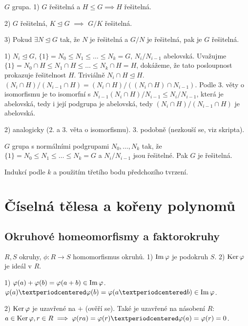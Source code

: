 \documentclass[12pt]{article}                   %
\begin{document}
        \begin{tvrzeni}
            $G$ grupa. 1) $G$ řešitelná a $H ≤ G \implies H$ řešitelná.

            2) $G$ řešitelná, $K \trianglelefteq G$ $\implies$ $G/K$ řešitelná.

            3) Pokud $\exists N \trianglelefteq G$ tak, že $N$ je řešitelná a $G / N$ je řešitelná, pak je $G$ řešitelná.

            \begin{dukazin}
                1) $N_i \trianglelefteq G$, $\{1\} = N_0 ≤ N_1 ≤ … ≤ N_k = G$, $N_i / N_{i-1}$ abelovská. Uvažujme $\{1\} = N_0 \cap H ≤ N_1 \cap H ≤ … ≤ N_k \cap H = H$, dokážeme, že tato posloupnost prokazuje řešitelnost $H$. Triviálně $N_i \cap H \trianglelefteq H$. $(N_i\cap H)/(N_{i-1} \cap H) = (N_i \cap H)/((N_i \cap H) \cap N_{i-1})$. Podle 3. věty o isomorfismu je to isomorfní s $N_{i-1}(N_i \cap H) / N_{i-1} ≤ N_i / N_{i-1}$, která je abelovská, tedy i její podgrupa je abelovská, tedy $(N_i \cap H)/(N_{i-1} \cap H)$ je abelovská.

                2) analogicky (2. a 3. věta o isomorfismu). 3. podobně (nezkouší se, viz skripta).
            \end{dukazin}
        \end{tvrzeni}

        \begin{dusledek}
            $G$ grupa s normálními podgrupami $N_0, …, N_k$ tak, že $\{1\} = N_0 ≤ N_1 ≤ … ≤ N_k = G$ a $N_i/N_{i-1}$ jsou řešitelné. Pak $G$ je řešitelná.

            \begin{dukazin}
                Indukcí podle $k$ a použitím třetího bodu předchozího tvrzení.
            \end{dukazin}
        \end{dusledek}

\section{Číselná tělesa a kořeny polynomů}
    \subsection{Okruhové homeomorfismy a faktorokruhy}
        \begin{tvrzeni}
            $R, S$ okruhy, $\phi: R \rightarrow S$ homomorfismus okruhů. 1) $\operatorname{Im} \varphi$ je podokruh $S$. 2) $\operatorname{Ker} \varphi$ je ideál v $R$.

            \begin{dukazin}
                1) $\varphi(a) + \varphi(b) = \varphi(a+b) \in \operatorname{Im} \varphi$. $\phi(a)·\phi(b) = \phi(a·b) \in \im \phi$.

                2) $\operatorname{Ker} \varphi$ je uzavřené na $+$ (ověří se). Také je uzavřené na násobení $R$: $a \in \Ker \phi, r \in R \implies \phi(ra) = \phi(r)·\phi(a) = \phi(r) = 0$.
            \end{dukazin}
        \end{tvrzeni}
\end{document}

